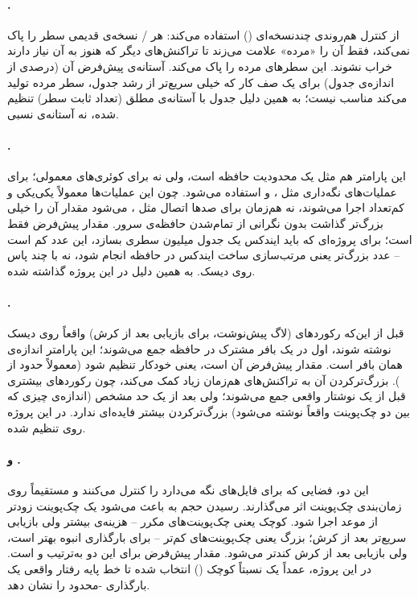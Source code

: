 \paragraph{.}  از کنترل هم‌روندی چندنسخه‌ای () استفاده می‌کند: هر / نسخه‌ی قدیمی سطر را پاک نمی‌کند، فقط آن را «مرده» علامت می‌زند تا تراکنش‌های دیگر که هنوز به آن نیاز دارند خراب نشوند.  این سطرهای مرده را پاک می‌کند. آستانه‌ی پیش‌فرض آن (درصدی از اندازه‌ی جدول) برای یک صف کار که خیلی سریع‌تر از رشد جدول، سطر مرده تولید می‌کند مناسب نیست؛ به همین دلیل جدول  با آستانه‌ی مطلق (تعداد ثابت سطر) تنظیم شده، نه آستانه‌ی نسبی.

\paragraph{.} این پارامتر هم مثل  یک محدودیت حافظه است، ولی نه برای کوئری‌های معمولی؛ برای عملیات‌های نگه‌داری مثل ،  و  استفاده می‌شود. چون این عملیات‌ها معمولاً یکی‌یکی و کم‌تعداد اجرا می‌شوند، نه هم‌زمان برای صدها اتصال مثل ، می‌شود مقدار آن را خیلی بزرگ‌تر گذاشت بدون نگرانی از تمام‌شدن حافظه‌ی سرور. مقدار پیش‌فرض  فقط  است؛ برای پروژه‌ای که باید ایندکس یک جدول  میلیون سطری بسازد، این عدد کم است -- عدد بزرگ‌تر یعنی مرتب‌سازی ساخت ایندکس در حافظه انجام شود، نه با چند پاس روی دیسک. به همین دلیل در این پروژه  گذاشته شده.

\paragraph{.} قبل از این‌که رکوردهای  (لاگ پیش‌نوشت، برای بازیابی بعد از کرش) واقعاً روی دیسک نوشته شوند، اول در یک بافر مشترک در حافظه جمع می‌شوند؛ این پارامتر اندازه‌ی همان بافر است. مقدار پیش‌فرض آن  است، یعنی خودکار تنظیم شود (معمولاً حدود  از ). بزرگ‌ترکردن آن به تراکنش‌های هم‌زمان زیاد کمک می‌کند، چون رکوردهای بیشتری قبل از یک نوشتار واقعی جمع می‌شوند؛ ولی بعد از یک حد مشخص (اندازه‌ی چیزی که بین دو چک‌پوینت واقعاً نوشته می‌شود) بزرگ‌ترکردن بیشتر فایده‌ای ندارد. در این پروژه روی  تنظیم شده.

\paragraph{ و .} این دو، فضایی که  برای فایل‌های  نگه می‌دارد را کنترل می‌کنند و مستقیماً روی زمان‌بندی چک‌پوینت اثر می‌گذارند. رسیدن حجم  به  باعث می‌شود یک چک‌پوینت زودتر از موعد اجرا شود.  کوچک یعنی چک‌پوینت‌های مکرر -- هزینه‌ی  بیشتر ولی بازیابی سریع‌تر بعد از کرش؛  بزرگ یعنی چک‌پوینت‌های کم‌تر -- برای بارگذاری انبوه بهتر است، ولی بازیابی بعد از کرش کندتر می‌شود. مقدار پیش‌فرض  برای این دو به‌ترتیب  و  است. در این پروژه، عمداً یک  نسبتاً کوچک () انتخاب شده تا خط پایه رفتار واقعی یک بارگذاری -محدود را نشان دهد.

